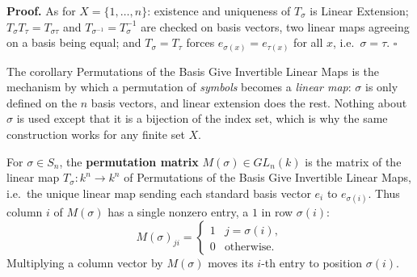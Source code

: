 \documentclass[11pt]{report}
\renewenvironment{proof}[1][Proof]{\noindent\textbf{#1.} }{\hfill$\square$\par\vspace{5pt}}
\begin{document}
\begin{proof}
As for $X = \{1, \ldots, n\}$: existence and uniqueness of $T_\sigma$ is Linear Extension; $T_\sigma T_\tau = T_{\sigma\tau}$ and $T_{\sigma^{-1}} = T_\sigma^{-1}$ are checked on basis vectors, two linear maps agreeing on a basis being equal; and $T_\sigma = T_\tau$ forces $e_{\sigma(x)} = e_{\tau(x)}$ for all $x$, i.e.\ $\sigma = \tau$.
\end{proof}

\begin{rembox}\label{rem:set-vector-space}
The corollary Permutations of the Basis Give Invertible Linear Maps is the mechanism by which a permutation of \emph{symbols} becomes a \emph{linear map}: $\sigma$ is only defined on the $n$ basis vectors, and linear extension does the rest. Nothing about $\sigma$ is used except that it is a bijection of the index set, which is why the same construction works for any finite set $X$.
\end{rembox}

\begin{defbox}\label{def:permutation-matrices}
For $\sigma \in S_n$, the \textbf{permutation matrix} $M(\sigma) \in GL_n(k)$ is the matrix of the linear map $T_\sigma: k^n \to k^n$ of Permutations of the Basis Give Invertible Linear Maps, i.e.\ the unique linear map sending each standard basis vector $e_i$ to $e_{\sigma(i)}$. Thus column $i$ of $M(\sigma)$ has a single nonzero entry, a $1$ in row $\sigma(i)$:
\[ M(\sigma)_{ji} = \begin{cases} 1 & j = \sigma(i), \\ 0 & \text{otherwise.} \end{cases} \]
Multiplying a column vector by $M(\sigma)$ moves its $i$-th entry to position $\sigma(i)$.
\end{defbox}
\end{document}

